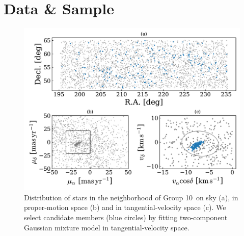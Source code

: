 \documentclass[modern,letterpaper]{aastex61}
\newcommand{\groupTen}{Group 10}
\begin{document}
\section{Data \& Sample}
\label{sec:data}

%


\begin{figure}
  \includegraphics[width=0.95\linewidth]{g10_sky_pm.pdf}
  \caption{Distribution of stars in the neighborhood of \groupTen\
    on sky (a), in proper-motion space (b) and in tangential-velocity space (c).
    We select candidate members (blue circles) by fitting two-component Gaussian
    mixture model in tangential-velocity space.
    }
  \label{fig:distributions}
\end{figure}
\end{document}
